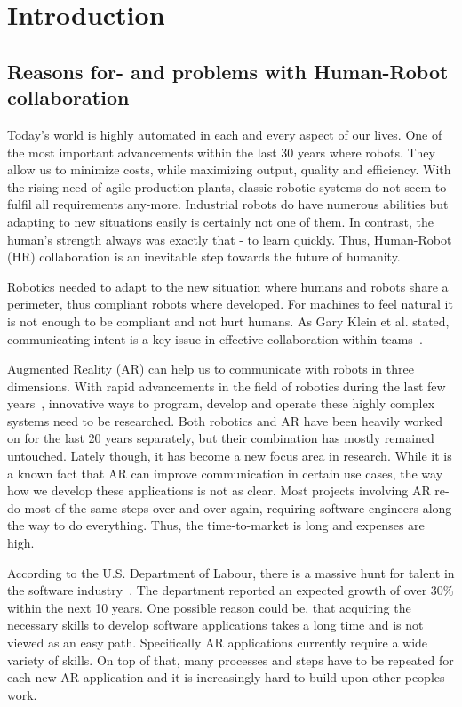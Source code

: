 \chapter{Introduction}\label{Chap:Introduction}

\section{Reasons for- and problems with Human-Robot collaboration}\label{Section:ProblemDescription}
Today's world is highly automated in each and every aspect of our lives. One of the most important advancements within the last 30 years where robots. They allow us to minimize costs, while maximizing output, quality and efficiency. With the rising need of agile production plants, classic robotic systems do not seem to fulfil all requirements any-more. Industrial robots do have numerous abilities but adapting to new situations easily is certainly not one of them. In contrast, the human's strength always was exactly that - to learn quickly. Thus, Human-Robot (HR) collaboration is an inevitable step towards the future of humanity.

Robotics needed to adapt to the new situation where humans and robots share a perimeter, thus compliant robots where developed. For machines to feel natural it is not enough to be compliant and not hurt humans. As Gary Klein et al. stated, communicating intent is a key issue in effective collaboration within teams~\cite{klein2005common}. 

Augmented Reality (AR) can help us to communicate with robots in three dimensions. With rapid advancements in the field of robotics during the last few years~\cite{laschi2016soft}, innovative ways to program, develop and operate these highly complex systems need to be researched. Both robotics and AR have been heavily worked on for the last 20 years separately, but their combination has mostly remained untouched. Lately though, it has become a new focus area in research. While it is a known fact that AR can improve communication in certain use cases, the way how we develop these applications is not as clear. Most projects involving AR re-do most of the same steps over and over again, requiring software engineers along the way to do everything. Thus, the time-to-market is long and expenses are high.

According to the U.S. Department of Labour, there is a massive hunt for talent in the software industry~\cite{blsGov}. The department reported an expected growth of over 30\% within the next 10 years. One possible reason could be, that acquiring the necessary skills to develop software applications takes a long time and is not viewed as an easy path. Specifically AR applications currently require a wide variety of skills. On top of that, many processes and steps have to be repeated for each new AR-application and it is increasingly hard to build upon other peoples work.

